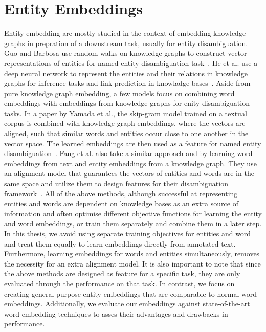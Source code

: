 \section{Entity Embeddings}
\label{sec:enity_embed}
Entity embedding are mostly studied in the context of embedding knowledge graphs in prepration of a downstream task, usually for entity disambiguation. Guo and Barbosa use random walks on knowledge graphs to construct vector representations of entities for named entity disambiguation task~. He et al. use a deep neural network to represent the entities and their relations in knowledge graphs for inference tasks and link prediction in knowladge bases~. Aside from pure knowledge graph embedding, a few models focus on combining word embeddings with embeddings from knowledge graphs for enity disambiguation tasks. In a paper by Yamada et al., the skip-gram model trained on a textual corpus is combined with knowledge graph embeddings, where the vectors are aligned, such that similar words and entities occur close to one another in the vector space. The learned embeddings are then used as a feature for named entity disambiguation~. Fang et al. also take a similar approach and by learning word embeddings from text and entity embeddings from a knowledge graph. They use an alignment model that guarantees the vectors of entities and words are in the same space and utilize them to design features for their disambiguation framework~. All of the above methods, although successful at representing entities and words are dependent on knowledge bases as an extra source of information and often optimise different objective functions for learning the entity and word embeddings, or train them separately and combine them in a later step. In this thesis, we avoid using separate training objectives for entities and word and treat them equally to learn embeddings directly from annotated text. Furthermore, learning embeddings for words and entities simultaneously, removes the necessity for an extra alignment model. It is also important to note that since the above methods are designed as feature for a specific task, they are only evaluated through the performance on that task. In contrast, we focus on creating general-purpose entity embeddings that are comparable to normal word embeddings. Additionally, we evaluate our embeddings against state-of-the-art word embedding techniques to asses their advantages and drawbacks in performance. \\

